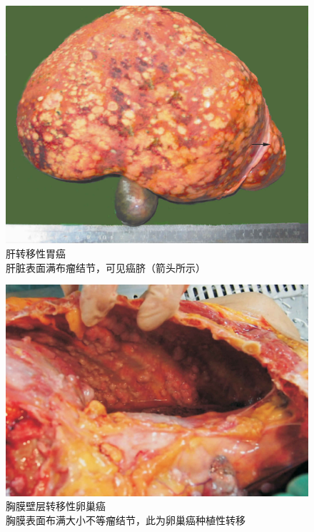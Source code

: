 \begin{figure}[!htbp]
  \centering
  \includegraphics{./images/Image00075.jpg}
  \caption{肝转移性胃癌 \\ {\small 肝脏表面满布瘤结节，可见癌脐（箭头所示）}}
  \label{fig5-8}
\end{figure}



\begin{figure}[!htbp]
  \centering
  \includegraphics{./images/Image00076.jpg}
  \caption{胸膜壁层转移性卵巢癌 \\ {\small 胸膜表面布满大小不等瘤结节，此为卵巢癌种植性转移}}
  \label{fig5-9}
\end{figure}



